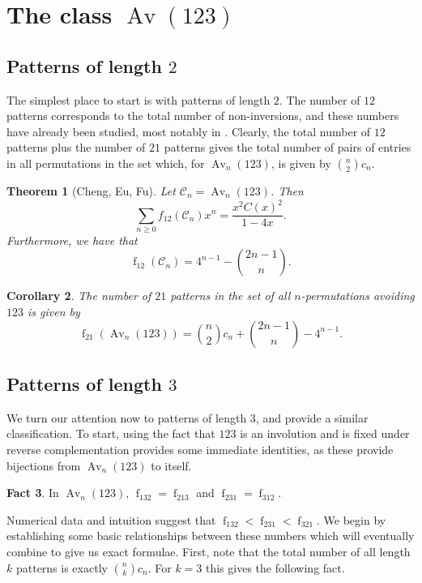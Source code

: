 \documentclass[11pt]{article} %
\theoremstyle{plain}
\newtheorem{theorem}{Theorem}
\newtheorem{corollary}[theorem]{Corollary}
\theoremstyle{definition}
\newtheorem{fact}[theorem]{Fact}
\newcommand{\C}{\mathcal{C}}
\newcommand{\Avn}{\Av_n(123)}
\DeclareMathOperator{\Av}{Av}
\DeclareMathOperator{\num}{f}
\begin{document}
\section{The class $\Av(123)$}
\subsection{Patterns of length $2$}

  The simplest place to start is with patterns of length $2$. The
  number of $12$ patterns corresponds to the total number of
  non-inversions, and these numbers have already been studied, most
  notably in \cite{cheng7}. Clearly, the total number of $12$ patterns
  plus the number of $21$ patterns gives the total number of pairs of
  entries in all permutations in the set which, for $\Avn$, is given by
  $\binom{n}{2} c_n$.

  \begin{theorem}[Cheng, Eu, Fu] \label{inv}
    Let $\C_n = \Avn$. Then
    $$ \sum_{n \geq 0} f_{12}(\C_n) x^n = \frac{x^2 C(x)^2}{1-4x}.$$
    Furthermore, we have that
    $$ \num_{12}(\C_n) = 4^{n-1} - \binom{2n-1}{n}.$$
  \end{theorem}

  \begin{corollary}
    The number of $21$ patterns in the set of all $n$-permutations
    avoiding $123$ is given by
    $$ \num_{21}(\Avn) = \binom{n}{2} c_n + \binom{2n-1}{n} - 4^{n-1}.$$
  \end{corollary}


\subsection{Patterns of length $3$}

  We turn our attention now to patterns of length $3$, and provide a
  similar classification. To start, using the fact that $123$ is an
  involution and is fixed under reverse complementation provides some
  immediate identities, as these provide bijections from $\Avn$ to
  itself.

  \begin{fact}
    In $\Avn$, $\num_{132} = \num_{213}$ and $\num_{231} =
    \num_{312}$.
  \end{fact}

  Numerical data and intuition suggest that $\num_{132} < \num_{231}
  < \num_{321}$. We begin by establishing some basic relationships
  between these numbers which will eventually combine to give us
  exact formulae. First, note that the total number of all length $k$
  patterns is exactly $\binom{n}{k} c_n$. For $k = 3$ this gives the
  following fact.
\end{document}
